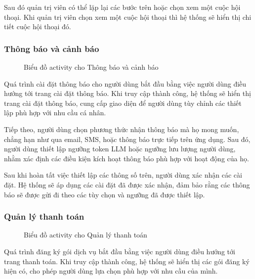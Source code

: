 Sau đó quản trị viên có thể lặp lại các bước trên hoặc chọn xem một cuộc hội thoại. Khi quản trị viên chọn xem một cuộc hội thoại thì hệ thống sẽ hiển thị chi tiết cuộc hội thoại đó.
\subsubsection{Thông báo và cảnh báo}
\begin{figure}[H]
    \centering
     
    \vspace{0.5cm}
    \caption{Biểu đồ activity cho Thông báo và cảnh báo}
    \label{fig:enter-label}
\end{figure}

\par Quá trình cài đặt thông báo cho người dùng bắt đầu bằng việc người dùng điều hướng tới trang cài đặt thông báo. Khi truy cập thành công, hệ thống sẽ hiển thị trang cài đặt thông báo, cung cấp giao diện để người dùng tùy chỉnh các thiết lập phù hợp với nhu cầu cá nhân.

Tiếp theo, người dùng chọn phương thức nhận thông báo mà họ mong muốn, chẳng hạn như qua email, SMS, hoặc thông báo trực tiếp trên ứng dụng. Sau đó, người dùng thiết lập ngưỡng token LLM hoặc ngưỡng lưu lượng người dùng, nhằm xác định các điều kiện kích hoạt thông báo phù hợp với hoạt động của họ.

Sau khi hoàn tất việc thiết lập các thông số trên, người dùng xác nhận các cài đặt. Hệ thống sẽ áp dụng các cài đặt đã được xác nhận, đảm bảo rằng các thông báo sẽ được gửi đi theo các tùy chọn và ngưỡng đã được thiết lập.

\subsubsection{Quản lý thanh toán}
\begin{figure}[H]
    \centering
     
    \vspace{0.5cm}
    \caption{Biểu đồ activity cho Quản lý thanh toán}
    \label{fig:enter-label}
\end{figure}

\par Quá trình đăng ký gói dịch vụ bắt đầu bằng việc người dùng điều hướng tới trang thanh toán. Khi truy cập thành công, hệ thống sẽ hiển thị các gói đăng ký hiện có, cho phép người dùng lựa chọn phù hợp với nhu cầu của mình.

